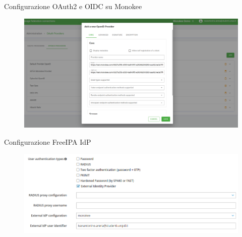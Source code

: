 \documentclass{beamer}
\begin{document}

	
	\begin{frame}{Configurazione OAuth2 e OIDC su Monokee}
		\begin{figure}[H] 
			\centering 
			\includegraphics[width=\columnwidth]{immagini/monokee-oidc.png} 
			\label{fig:oidc-setup}
		\end{figure}
		
	\end{frame}
	
	\begin{frame}{Configurazione FreeIPA IdP}
		
		\begin{figure}[H] 
			\centering 
			\includegraphics[width=\columnwidth]{immagini/appendici/ipa-user.png} 
			\label{fig:ipa-setup-user}
		\end{figure}
	\end{frame}
	
\end{document}
